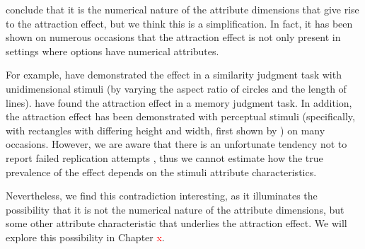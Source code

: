 \documentclass[11pt,a4paper]{article}
\begin{document}
\citeauthor{Frederick2014} conclude that it is the numerical nature of the attribute dimensions that give rise to the attraction effect, but we think this is a simplification. In fact, it has been shown on numerous occasions that the attraction effect is not only present in settings where options have numerical attributes. 

For example,  have demonstrated the effect in a similarity judgment task with unidimensional stimuli (by varying the aspect ratio of circles and the length of lines).  have found the attraction effect in a memory judgment task. In addition, the attraction effect has been demonstrated with perceptual stimuli (specifically, with rectangles with differing height and width, first shown by ) on many occasions.  However, we are aware that there is an unfortunate tendency not to report failed replication attempts \cite{Ingre2015}, thus we cannot estimate how the true prevalence of the effect depends on the stimuli attribute characteristics.

Nevertheless, we find this contradiction interesting, as it illuminates the possibility that it is not the numerical nature of the attribute dimensions, but some other attribute characteristic that underlies the attraction effect. We will explore this possibility in Chapter \textcolor{red}{x}.














\newpage


\end{document}
